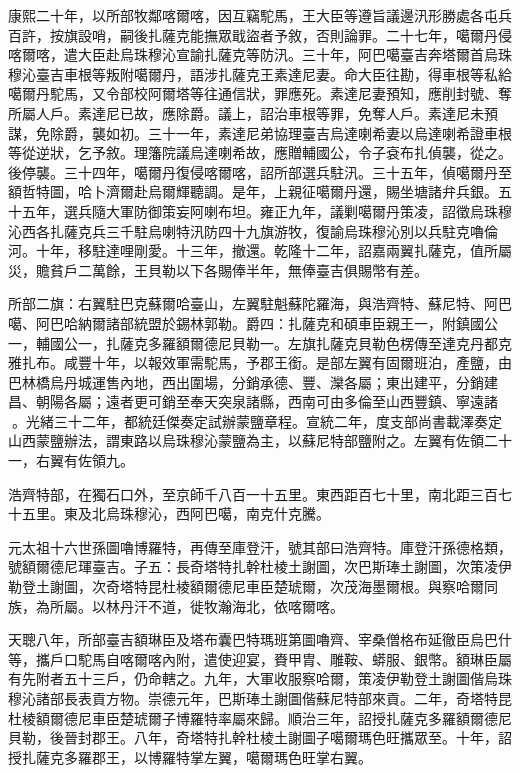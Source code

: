 \begin{pinyinscope}
康熙二十年，以所部牧鄰喀爾喀，因互竊駝馬，王大臣等遵旨議邊汛形勝處各屯兵百許，按旗設哨，嗣後扎薩克能撫眾戢盜者予敘，否則論罪。二十七年，噶爾丹侵喀爾喀，遣大臣赴烏珠穆沁宣諭扎薩克等防汛。三十年，阿巴噶臺吉奔塔爾首烏珠穆沁臺吉車根等叛附噶爾丹，語涉扎薩克王素達尼妻。命大臣往勘，得車根等私給噶爾丹駝馬，又令部校阿爾塔等往通信狀，罪應死。素達尼妻預知，應削封號、奪所屬人戶。素達尼已故，應除爵。議上，詔治車根等罪，免奪人戶。素達尼未預謀，免除爵，襲如初。三十一年，素達尼弟協理臺吉烏達喇希妻以烏達喇希證車根等從逆狀，乞予敘。理籓院議烏達喇希故，應贈輔國公，令子袞布扎偵襲，從之。後停襲。三十四年，噶爾丹復侵喀爾喀，詔所部選兵駐汛。三十五年，偵噶爾丹至額哲特圖，哈卜濟爾赴烏爾輝聽調。是年，上親征噶爾丹還，賜坐塘諸弁兵銀。五十五年，選兵隨大軍防御策妄阿喇布坦。雍正九年，議剿噶爾丹策凌，詔徵烏珠穆沁西各扎薩克兵三千駐烏喇特汛防四十九旗游牧，復諭烏珠穆沁別以兵駐克嚕倫河。十年，移駐達哩剛愛。十三年，撤還。乾隆十二年，詔嘉兩翼扎薩克，值所屬災，贍貧戶二萬餘，王貝勒以下各賜俸半年，無俸臺吉俱賜幣有差。

所部二旗：右翼駐巴克蘇爾哈臺山，左翼駐魁蘇陀羅海，與浩齊特、蘇尼特、阿巴噶、阿巴哈納爾諸部統盟於錫林郭勒。爵四：扎薩克和碩車臣親王一，附鎮國公一，輔國公一，扎薩克多羅額爾德尼貝勒一。左旗扎薩克貝勒色楞傳至達克丹都克雅扎布。咸豐十年，以報效軍需駝馬，予郡王銜。是部左翼有固爾班泊，產鹽，由巴林橋烏丹城運售內地，西出圍場，分銷承德、豐、灤各屬；東出建平，分銷建昌、朝陽各屬；遠者更可銷至奉天突泉諸縣，西南可由多倫至山西豐鎮、寧遠諸。光緒三十二年，都統廷傑奏定試辦蒙鹽章程。宣統二年，度支部尚書載澤奏定山西蒙鹽辦法，謂東路以烏珠穆沁蒙鹽為主，以蘇尼特部鹽附之。左翼有佐領二十一，右翼有佐領九。

浩齊特部，在獨石口外，至京師千八百一十五里。東西距百七十里，南北距三百七十五里。東及北烏珠穆沁，西阿巴噶，南克什克騰。

元太祖十六世孫圖嚕博羅特，再傳至庫登汗，號其部曰浩齊特。庫登汗孫德格類，號額爾德尼琿臺吉。子五：長奇塔特扎幹杜棱土謝圖，次巴斯琫土謝圖，次策凌伊勒登土謝圖，次奇塔特昆杜棱額爾德尼車臣楚琥爾，次茂海墨爾根。與察哈爾同族，為所屬。以林丹汗不道，徙牧瀚海北，依喀爾喀。

天聰八年，所部臺吉額琳臣及塔布囊巴特瑪班第圖嚕齊、宰桑僧格布延徹臣烏巴什等，攜戶口駝馬自喀爾喀內附，遣使迎宴，賚甲胄、雕鞍、蟒服、銀幣。額琳臣屬有先附者五十三戶，仍命轄之。九年，大軍收服察哈爾，策凌伊勒登土謝圖偕烏珠穆沁諸部長表貢方物。崇德元年，巴斯琫土謝圖偕蘇尼特部來貢。二年，奇塔特昆杜棱額爾德尼車臣楚琥爾子博羅特率屬來歸。順治三年，詔授扎薩克多羅額爾德尼貝勒，後晉封郡王。八年，奇塔特扎幹杜棱土謝圖子噶爾瑪色旺攜眾至。十年，詔授扎薩克多羅郡王，以博羅特掌左翼，噶爾瑪色旺掌右翼。


\end{pinyinscope}
